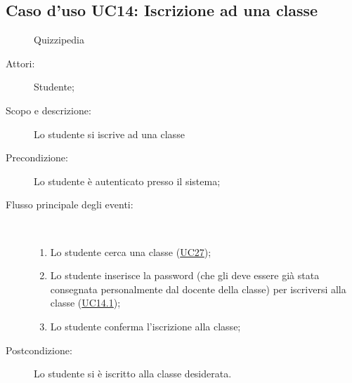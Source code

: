 \subsection{Caso d'uso UC14: Iscrizione ad una classe}
	\begin{figure}[H]
		\centering
		\begin{resizedtikzpicture}{\textwidth}
		\begin{umlsystem}[x=0, fill=lightgray!20]{Quizzipedia}
		\end{umlsystem}
		\end{resizedtikzpicture}
		\caption{}
	\end{figure}
\begin{description}
\item[Attori:] Studente;
\item[Scopo e descrizione:] Lo studente si iscrive ad una classe
      \item[Precondizione:] Lo studente è autenticato presso il sistema;

        \item[Flusso principale degli eventi:] \ 
 \begin{enumerate}
          \item Lo studente cerca una classe (\hyperlink{UC27}{UC27});
          \item Lo studente inserisce la password (che gli deve essere già stata consegnata personalmente dal docente della classe) per iscriversi alla classe (\hyperlink{UC14.1}{UC14.1});
          \item Lo studente conferma l'iscrizione alla classe;

      \end{enumerate}
    \item[Postcondizione:] Lo studente si è iscritto alla classe desiderata.
  \end{description}
\hypertarget{UC14.1}{}
